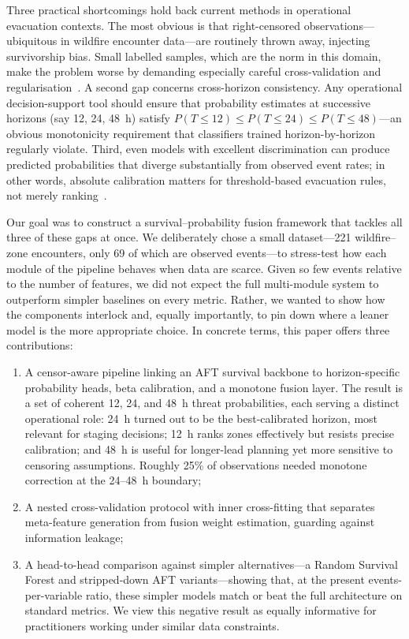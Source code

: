 \documentclass[fire,article,submit,pdftex]{../Definitions/mdpi}
\begin{document}
Three practical shortcomings hold back current methods in operational evacuation contexts.
The most obvious is that right-censored observations---ubiquitous in wildfire encounter data---are routinely thrown away, injecting survivorship bias. Small labelled samples, which are the norm in this domain, make the problem worse by demanding especially careful cross-validation and regularisation~\cite{Steyerberg2019,Collins2024,Riley2020}.
A second gap concerns cross-horizon consistency. Any operational decision-support tool should ensure that probability estimates at successive horizons (say 12, 24, 48~h) satisfy $P(T \leq 12) \leq P(T \leq 24) \leq P(T \leq 48)$---an obvious monotonicity requirement that classifiers trained horizon-by-horizon regularly violate.
Third, even models with excellent discrimination can produce predicted probabilities that diverge substantially from observed event rates; in other words, absolute calibration matters for threshold-based evacuation rules, not merely ranking~\cite{VanCalster2019}.

Our goal was to construct a survival--probability fusion framework that tackles all three of these gaps at once.
We deliberately chose a small dataset---221 wildfire--zone encounters, only 69 of which are observed events---to stress-test how each module of the pipeline behaves when data are scarce. Given so few events relative to the number of features, we did not expect the full multi-module system to outperform simpler baselines on every metric. Rather, we wanted to show how the components interlock and, equally importantly, to pin down where a leaner model is the more appropriate choice.
In concrete terms, this paper offers three contributions:
\begin{enumerate}
    \item A censor-aware pipeline linking an AFT survival backbone to horizon-specific probability heads, beta calibration, and a monotone fusion layer. The result is a set of coherent 12, 24, and 48~h threat probabilities, each serving a distinct operational role: 24~h turned out to be the best-calibrated horizon, most relevant for staging decisions; 12~h ranks zones effectively but resists precise calibration; and 48~h is useful for longer-lead planning yet more sensitive to censoring assumptions. Roughly 25\% of observations needed monotone correction at the 24--48~h boundary;
    \item A nested cross-validation protocol with inner cross-fitting that separates meta-feature generation from fusion weight estimation, guarding against information leakage;
    \item A head-to-head comparison against simpler alternatives---a Random Survival Forest and stripped-down AFT variants---showing that, at the present events-per-variable ratio, these simpler models match or beat the full architecture on standard metrics. We view this negative result as equally informative for practitioners working under similar data constraints.
\end{enumerate}
\end{document}
